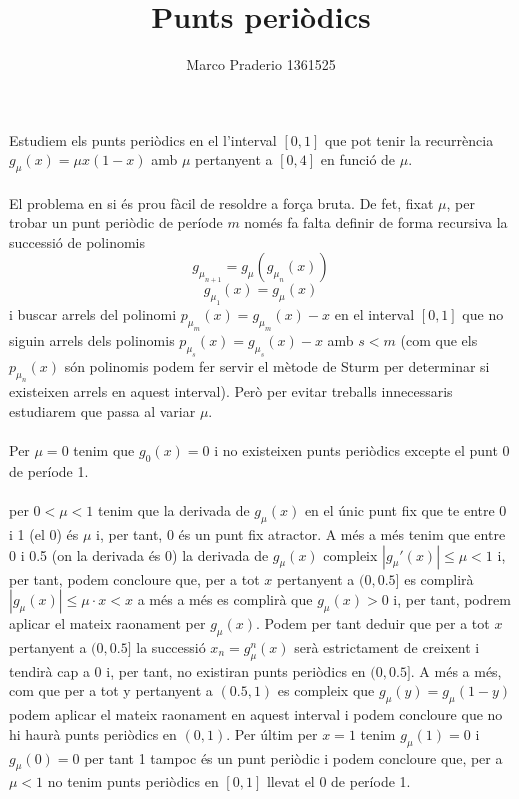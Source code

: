\documentclass[a4paper,10pt]{article}
\title{Punts periòdics}
\author{Marco Praderio 1361525}
\date{}
\renewcommand{\*}{\cdot}
\begin{document}
\maketitle
Estudiem els punts periòdics en el l'interval $[0,1]$ que pot tenir la recurrència $g_{\mu}(x)=\mu x(1-x)$ amb $\mu$ pertanyent a $[0,4]$ en funció de $\mu$.\\
\phantom{-}\\
El problema en si és prou fàcil de resoldre a força bruta. De fet, fixat $\mu$, per trobar un punt periòdic de període $m$ només fa falta definir de forma recursiva la successió
de polinomis
\begin{equation*}
g_{\mu_{n+1}}=g_{\mu}(g_{\mu_n}(x))
\end{equation*}
\begin{equation*}
g_{\mu_1}(x)=g_{\mu}(x)
\end{equation*}
i buscar arrels del polinomi $p_{\mu_m}(x)=g_{\mu_m}(x)-x$ en el interval $[0,1]$ que no siguin arrels dels polinomis $p_{\mu_s}(x)=g_{\mu_s}(x)-x$ amb   $s<m$
(com que els $p_{\mu_n}(x)$ són polinomis podem fer servir el mètode de Sturm per determinar si existeixen arrels en aquest interval). Però per evitar treballs innecessaris
estudiarem que passa al variar $\mu$.\\
\phantom{.}\\
Per $\mu=0$ tenim que $g_0(x)=0$ i no existeixen punts periòdics excepte el punt 0 de període 1.\\
\phantom{.}\\
per $0<\mu<1$ tenim que la derivada de $g_{\mu}(x)$ en el únic punt fix que te entre 0 i 1 (el 0) és $\mu$ i, per tant, 0 és un punt fix atractor. A més a més tenim que entre
0 i 0.5 (on la derivada és 0) la derivada de $g_{\mu}(x)$ compleix $|g_{\mu}'(x)|\le \mu<1$ i, per tant, podem concloure que, per a tot $x$ pertanyent a $(0,0.5]$
es complirà $|g_{\mu}(x)|\le\mu\*x<x$ a més a més es complirà que   $g_{\mu}(x)>0$  i, per tant, podrem aplicar el mateix raonament per $g_{\mu}(x)$. Podem per tant deduir
que per a tot $x$ pertanyent a $(0,0.5]$ la successió  $x_n=g_{\mu}^n(x)$ serà estrictament de creixent i tendirà cap a 0 i, per tant, no existiran punts periòdics en 
$(0,0.5]$. A més a més, com que per a tot y pertanyent a $(0.5,1)$ es compleix que $g_{\mu}(y)=g_{\mu}(1-y)$ podem aplicar el mateix raonament en aquest interval i podem
concloure que no hi haurà punts periòdics en $(0,1)$. Per últim per $x=1$ tenim $g_{\mu}(1)=0$ i $g_{\mu}(0)=0$ per tant 1 tampoc és un punt periòdic i podem concloure que,
per a $\mu<1$ no tenim punts periòdics en $[0,1]$ llevat el 0 de període 1.\\
\end{document}
